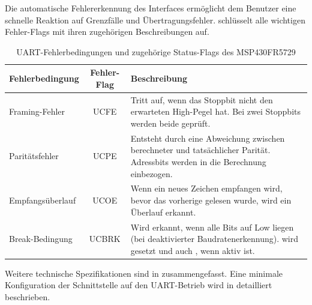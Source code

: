 Die automatische Fehlererkennung des Interfaces erm\"oglicht dem Benutzer eine schnelle Reaktion auf Grenzf\"alle und \"Ubertragungsfehler.  schl\"usselt alle wichtigen Fehler-Flags mit ihren zugeh\"origen Beschreibungen auf.

\vspace{1cm}
\begin{table}[h!]
	\small
	\centering
	\begin{tabular}{|l|c|p{8.5cm}|}
		\hline
		\textbf{Fehlerbedingung} & \textbf{Fehler-Flag} & \textbf{Beschreibung} \\
		\hline
		Framing-Fehler & UCFE & Tritt auf, wenn das Stoppbit nicht den erwarteten High-Pegel hat. Bei zwei Stoppbits werden beide gepr\"uft.\\\hline
		Parit\"atsfehler & UCPE & Entsteht durch eine Abweichung zwischen berechneter und tats\"achlicher Parit\"at. Adressbits werden in die Berechnung einbezogen.\\\hline
		Empfangs\"uberlauf & UCOE & Wenn ein neues Zeichen empfangen wird, bevor das vorherige gelesen wurde, wird ein \"Uberlauf erkannt.\\\hline
		Break-Bedingung & UCBRK & Wird erkannt, wenn alle Bits auf Low liegen (bei deaktivierter Baudratenerkennung). \Code{UCBRK} wird gesetzt und \ggf auch \Code{UCRXIFG}, wenn \Code{UCBRKIE} aktiv ist. \\\hline
	\end{tabular}
	\caption{UART-Fehlerbedingungen und zugeh\"orige Status-Flags des MSP430FR5729\\}
	\label{tab:uart_error_flags}
\end{table}

\newpage
Weitere technische Spezifikationen sind in  zusammengefasst. Eine minimale Konfiguration der Schnittstelle auf den UART-Betrieb wird in  detailliert beschrieben.

